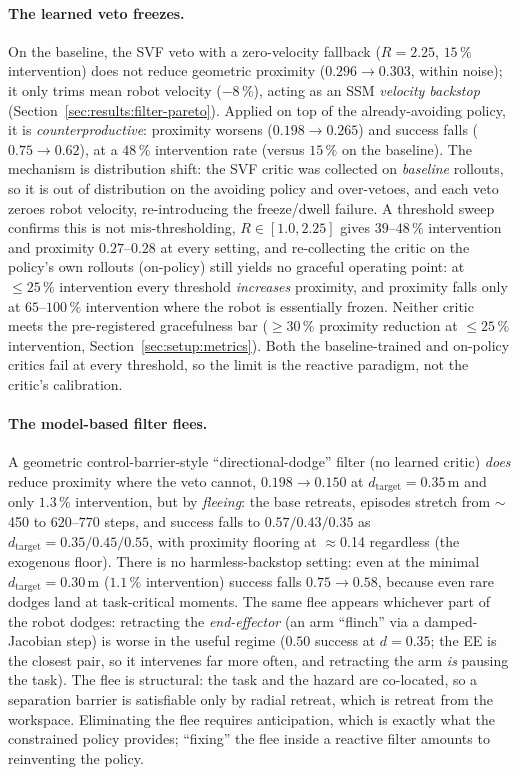 \documentclass[11pt,a4paper]{report}
\newcommand{\ssm}{SSM}
\begin{document}
\paragraph{The learned veto freezes.}
On the baseline, the SVF veto with a zero-velocity fallback
($R = 2.25$, $15\,\%$ intervention) does not reduce geometric proximity
($0.296 \rightarrow 0.303$, within noise); it only trims mean robot
velocity ($-8\,\%$), acting as an \ssm{} \emph{velocity backstop}
(Section~\ref{sec:results:filter-pareto}). Applied on top of the
already-avoiding policy, it is \emph{counterproductive}: proximity
worsens ($0.198 \rightarrow 0.265$) and success falls
($0.75 \rightarrow 0.62$), at a $48\,\%$ intervention rate (versus
$15\,\%$ on the baseline). The mechanism is distribution shift: the SVF
critic was collected on \emph{baseline} rollouts, so it is out of
distribution on the avoiding policy and over-vetoes, and each veto
zeroes robot velocity, re-introducing the freeze/dwell failure. A
threshold sweep confirms this is not mis-thresholding, $R \in [1.0,
2.25]$ gives $39$--$48\,\%$ intervention and proximity $0.27$--$0.28$ at
every setting, and re-collecting the critic on the policy's own
rollouts (on-policy) still yields no graceful operating point: at
$\le 25\,\%$ intervention every threshold \emph{increases} proximity,
and proximity falls only at $65$--$100\,\%$ intervention where the robot
is essentially frozen. Neither critic meets the pre-registered
gracefulness bar ($\geq 30\,\%$ proximity reduction at $\leq 25\,\%$
intervention, Section~\ref{sec:setup:metrics}). Both the
baseline-trained and on-policy critics fail at every threshold, so the
limit is the reactive paradigm, not the critic's calibration.

\paragraph{The model-based filter flees.}
A geometric control-barrier-style ``directional-dodge'' filter (no
learned critic) \emph{does} reduce proximity where the veto cannot,
$0.198 \rightarrow 0.150$ at $d_{\mathrm{target}} = 0.35$\,m and only
$1.3\,\%$ intervention, but by \emph{fleeing}: the base retreats,
episodes stretch from $\sim$450 to $620$--$770$ steps, and success
falls to $0.57/0.43/0.35$ as $d_{\mathrm{target}} = 0.35/0.45/0.55$,
with proximity flooring at $\approx$0.14 regardless (the exogenous
floor). There is no harmless-backstop setting: even at the minimal
$d_{\mathrm{target}} = 0.30$\,m ($1.1\,\%$ intervention) success
falls $0.75 \rightarrow 0.58$, because even rare dodges land at
task-critical moments. The same flee appears whichever part of the
robot dodges: retracting the \emph{end-effector} (an arm ``flinch''
via a damped-Jacobian step) is worse in the useful regime ($0.50$
success at $d = 0.35$; the EE is the closest pair, so it intervenes
far more often, and retracting the arm \emph{is} pausing the task).
The flee is structural: the task and the hazard are co-located, so a
separation barrier is satisfiable only by radial retreat, which is
retreat from the workspace. Eliminating the flee requires
anticipation, which is exactly what the constrained policy provides;
``fixing'' the flee inside a reactive filter amounts to reinventing
the policy.
\end{document}
